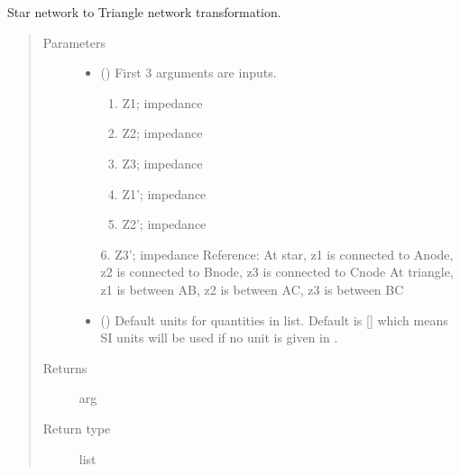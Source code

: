 \documentclass[letterpaper,10pt,english]{sphinxmanual}
\begin{document}

\begin{fulllineitems}
\label{\detokenize{components:components.Star2TriangleTransformation}}
Star network to Triangle network transformation.
\begin{quote}\begin{description}
\item[{Parameters}] \leavevmode\begin{itemize}
\item {} 
 () \textendash{} 
First 3 arguments are inputs.
\begin{enumerate}
%
\item {} 
Z1; impedance

\item {} 
Z2; impedance

\item {} 
Z3; impedance

\item {} 
Z1’; impedance

\item {} 
Z2’; impedance

\end{enumerate}

6. Z3’; impedance
Reference:
At star, z1 is connected to A\sphinxhyphen{}node, z2 is connected to B\sphinxhyphen{}node, z3 is connected to C\sphinxhyphen{}node
At triangle, z1 is between A\sphinxhyphen{}B, z2 is between A\sphinxhyphen{}C, z3 is between B\sphinxhyphen{}C


\item {} 
 (\sphinxstyleliteralemphasis{\sphinxupquote{, }}) \textendash{} Default units for quantities in  list. Default is {[}{]} which means SI units will be used if no unit is given in .

\end{itemize}

\item[{Returns}] \leavevmode
arg

\item[{Return type}] \leavevmode
list

\end{description}\end{quote}

\end{fulllineitems}
\end{document}
